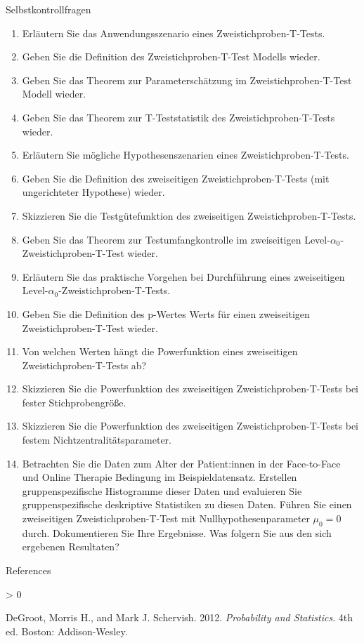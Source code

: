\documentclass[
  8pt,
  ignorenonframetext,
]{beamer}
\newlength{\cslhangindent}
\newenvironment{CSLReferences}[2] %
 {%
  \setlength{\parindent}{0pt}
  \ifodd #1 \everypar{\setlength{\hangindent}{\cslhangindent}}\ignorespaces\fi
  \ifnum #2 > 0
  \setlength{\parskip}{#2\baselineskip}
  \fi
 }%
 {}
\begin{document}
\begin{frame}{Selbstkontrollfragen}
\protect\hypertarget{selbstkontrollfragen-1}{}
\footnotesize
{}
\begin{enumerate}
\justifying
\itemsep0mm
\setcounter{enumi}{17}
\item Erläutern Sie das Anwendungsszenario eines Zweistichproben-T-Tests.
\item Geben Sie die Definition des Zweistichproben-T-Test Modells wieder.
\item Geben Sie das Theorem zur Parameterschätzung im Zweistichproben-T-Test Modell wieder.
\item Geben Sie das Theorem zur T-Teststatistik des Zweistichproben-T-Tests wieder.
\item Erläutern Sie mögliche Hypothesenszenarien eines Zweistichproben-T-Tests.
\item Geben Sie die Definition des zweiseitigen Zweistichproben-T-Tests (mit ungerichteter Hypothese) wieder.
\item Skizzieren Sie die Testgütefunktion des zweiseitigen Zweistichproben-T-Tests.
\item Geben Sie das Theorem zur Testumfangkontrolle im zweiseitigen Level-$\alpha_0$-Zweistichproben-T-Test wieder.
\item Erläutern Sie das praktische Vorgehen bei Durchführung eines zweiseitigen Level-$\alpha_0$-Zweistichproben-T-Tests.
\item Geben Sie die Definition des p-Wertes Werts für einen zweiseitigen Zweistichproben-T-Test wieder.
\item Von welchen Werten hängt die Powerfunktion eines zweiseitigen Zweistichproben-T-Tests ab?
\item Skizzieren Sie die Powerfunktion des zweiseitigen Zweistichproben-T-Tests bei fester Stichprobengröße.
\item Skizzieren Sie die Powerfunktion des zweiseitigen Zweistichproben-T-Tests bei festem Nichtzentralitätsparameter.
\item Betrachten Sie die Daten zum Alter der Patient:innen in der Face-to-Face und Online Therapie Bedingung im Beispieldatensatz. 
Erstellen gruppenspezifische Histogramme dieser Daten und evaluieren Sie gruppenspezifische deskriptive Statistiken zu diesen Daten. Führen Sie
einen zweiseitigen Zweistichproben-T-Test mit Nullhypothesenparameter $\mu_0 = 0$ durch. Dokumentieren Sie Ihre Ergebnisse.
Was folgern Sie aus den sich ergebenen Resultaten?
\end{enumerate}
\end{frame}

\begin{frame}{References}
\protect\hypertarget{references}{}
\footnotesize

\hypertarget{refs}{}
\begin{CSLReferences}{1}{0}
\leavevmode\hypertarget{ref-degroot_2012}{}%
DeGroot, Morris H., and Mark J. Schervish. 2012. \emph{Probability and
Statistics}. 4th ed. {Boston}: {Addison-Wesley}.

\end{CSLReferences}
\end{frame}
\end{document}
